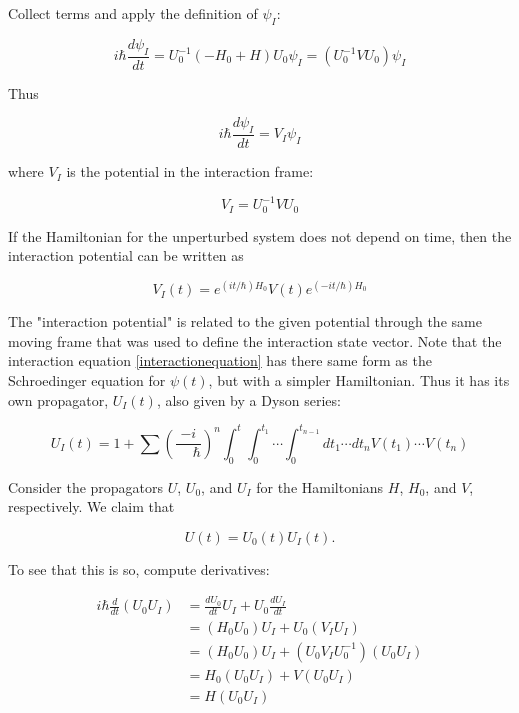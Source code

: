 Collect terms and apply the definition of $\psi_I$:

\begin{equation}
i\hbar\frac{d\psi_I}{dt} =  U_0^{-1}(-H_0 + H)U_0\psi_I = (U_0^{-1}VU_0)\psi_I 
\end{equation}

Thus

\begin{equation}
\label{interactionequation}
i\hbar\frac{d\psi_I}{dt} =  V_I\psi_I 
\end{equation}

where $V_I$ is the potential in the interaction frame:

\begin{equation}
V_I = U_0^{-1} V U_0
\end{equation}

If the Hamiltonian for the unperturbed system does not depend on time, then the interaction potential can be written as 

\begin{equation}
V_I(t) = e^{(it/\hbar)H_0} V(t) e^{(-it/\hbar)H_0}
\end{equation}

The "interaction potential" is related to the given potential through the same moving frame that was used to define the interaction state vector.
Note that the interaction equation \eqref{interactionequation} has there same form as the Schroedinger equation for $\psi(t)$, but with a simpler Hamiltonian.  Thus it has its own propagator, $U_I(t)$, also given by a Dyson series:

\begin{equation}
\label{interactionseries}
U_I(t) = 1 + \sum \left(\frac{-i}{\phantom{-}\hbar}\right)^n \int_0^t \int_0^{t_1}\cdots \int_0^{t_{n-1}} dt_1 \cdots dt_n V(t_1) \cdots V(t_n) 
\end{equation}


Consider the propagators $U$, $U_0$, and $U_I$ for the Hamiltonians $H$, $H_0$, and $V$, respectively. We claim that

\begin{equation}
U(t) = U_0(t)U_I(t).
\end{equation}

To see that this is so, compute derivatives:

\begin{align}
i\hbar \frac{d}{dt}(U_0U_I) &= \frac{dU_0}{dt} U_I + U_0\frac{dU_I}{dt} \\
&= (H_0U_0)U_I + U_0 (V_I U_I) \\
&= (H_0U_0)U_I + (U_0 V_I U_0^{-1})( U_0 U_I) \\
&=  H_0(U_0U_I) + V( U_0 U_I) \\
&= H(U_0U_I)
\end{align}



